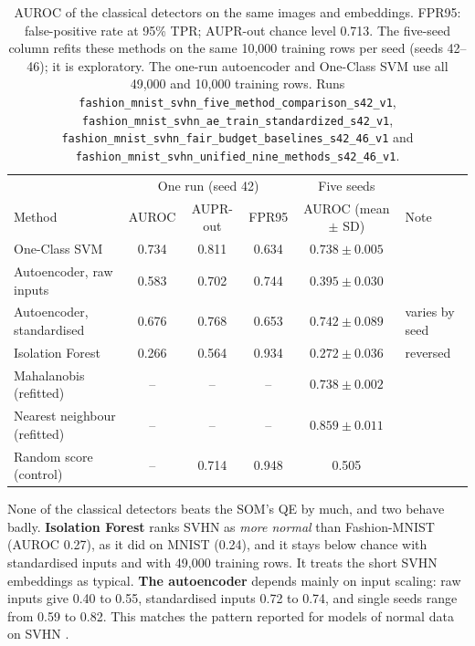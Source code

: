 \documentclass[11pt]{article}
\begin{document}
\begin{table}[H]
\centering\footnotesize\setlength{\tabcolsep}{4pt}
\begin{tabular}{@{}lccccl@{}}\toprule
 & \multicolumn{3}{c}{One run (seed 42)} & Five seeds & \\
Method & AUROC & AUPR-out & FPR95 & AUROC (mean $\pm$ SD) & Note\\\midrule
One-Class SVM & 0.734 & 0.811 & 0.634 & $0.738 \pm 0.005$ & \\
Autoencoder, raw inputs & 0.583 & 0.702 & 0.744 & $0.395 \pm 0.030$ & \\
Autoencoder, standardised & 0.676 & 0.768 & 0.653 & $0.742 \pm 0.089$ & varies by seed \\
Isolation Forest & 0.266 & 0.564 & 0.934 & $0.272 \pm 0.036$ & reversed \\
Mahalanobis (refitted) & -- & -- & -- & $0.738 \pm 0.002$ & \\
Nearest neighbour (refitted) & -- & -- & -- & $0.859 \pm 0.011$ & \\
Random score (control) & -- & 0.714 & 0.948 & 0.505 & \\\bottomrule
\end{tabular}
\caption{AUROC of the classical detectors on the same images and embeddings. FPR95: false-positive rate at 95\% TPR; AUPR-out chance level 0.713. The five-seed column refits these methods on the same 10,000 training rows per seed (seeds 42--46); it is exploratory. The one-run autoencoder and One-Class SVM use all 49,000 and 10,000 training rows. Runs \texttt{fashion\_mnist\_svhn\_five\_method\_comparison\_s42\_v1}, \texttt{fashion\_mnist\_svhn\_ae\_train\_standardized\_s42\_v1}, \texttt{fashion\_mnist\_svhn\_fair\_budget\_baselines\_s42\_46\_v1} and \texttt{fashion\_mnist\_svhn\_unified\_nine\_methods\_s42\_46\_v1}.}
\label{tab:classical}
\end{table}

None of the classical detectors beats the SOM's QE by much, and two behave badly. \textbf{Isolation Forest} ranks SVHN as \emph{more normal} than Fashion-MNIST (AUROC 0.27), as it did on MNIST (0.24), and it stays below chance with standardised inputs and with 49,000 training rows. It treats the short SVHN embeddings as typical. \textbf{The autoencoder} depends mainly on input scaling: raw inputs give 0.40 to 0.55, standardised inputs 0.72 to 0.74, and single seeds range from 0.59 to 0.82. This matches the pattern reported for models of normal data on SVHN \cite{nalisnick2019deep}.
\end{document}
